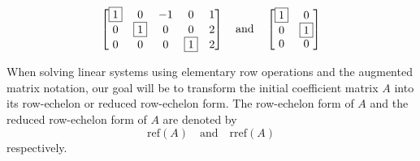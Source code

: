 \documentclass{ximera}
\begin{document}
$$\begin{bmatrix}  
 \fbox{1}&0&-1&0&1\\0&\fbox{1}&0&0&2\\0&0&0&\fbox{1}&2
 \end{bmatrix}\quad\text{and}\quad\begin{bmatrix}
 \fbox{1}&0\\0&\fbox{1}\\0&0
 \end{bmatrix}$$
 
 

When solving linear systems using elementary row operations and the augmented matrix notation, our goal will be to transform the initial coefficient matrix $A$ into its row-echelon or reduced row-echelon form.  The row-echelon form of $A$ and the reduced row-echelon form of $A$ are denoted by 
$$\mbox{ref}(A)\quad\text{and}\quad\mbox{rref}(A)$$
respectively.
\end{document}
